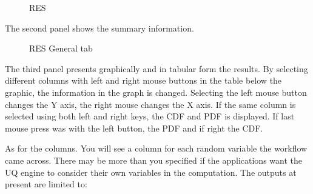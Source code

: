 \begin{figure}[!htbp]
  \caption{RES}
  \label{fig:figure12}
\end{figure}

The second panel shows the summary information.

\begin{figure}[!htbp]
  \caption{RES General tab}
  \label{fig:figure13}
\end{figure}

The third panel presents graphically and in tabular form the results. By selecting different columns with left and right mouse buttons in the table below the graphic, 
the information in the graph is changed. Selecting the left mouse button changes the Y axis, the right mouse changes the X axis. If the same column is selected 
using both left and right keys, the CDF and PDF is displayed. If last mouse press was with the left button, the PDF and if right the CDF.

As for the columns. You will see a column for each random variable the workflow came across. There may be more than you specified if the applications want the 
UQ engine to consider their own variables in the computation. The outputs at present are limited to:



